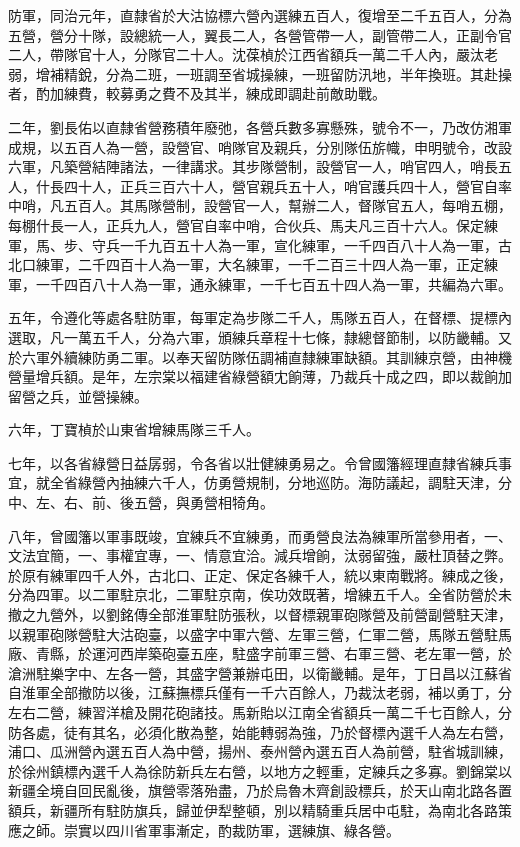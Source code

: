 \begin{pinyinscope}
防軍，同治元年，直隸省於大沽協標六營內選練五百人，復增至二千五百人，分為五營，營分十隊，設總統一人，翼長二人，各營管帶一人，副管帶二人，正副令官二人，帶隊官十人，分隊官二十人。沈葆楨於江西省額兵一萬二千人內，嚴汰老弱，增補精銳，分為二班，一班調至省城操練，一班留防汛地，半年換班。其赴操者，酌加練費，較募勇之費不及其半，練成即調赴前敵助戰。

二年，劉長佑以直隸省營務積年廢弛，各營兵數多寡懸殊，號令不一，乃改仿湘軍成規，以五百人為一營，設營官、哨隊官及親兵，分別隊伍旂幟，申明號令，改設六軍，凡築營結陣諸法，一律講求。其步隊營制，設營官一人，哨官四人，哨長五人，什長四十人，正兵三百六十人，營官親兵五十人，哨官護兵四十人，營官自率中哨，凡五百人。其馬隊營制，設營官一人，幫辦二人，督隊官五人，每哨五棚，每棚什長一人，正兵九人，營官自率中哨，合伙兵、馬夫凡三百十六人。保定練軍，馬、步、守兵一千九百五十人為一軍，宣化練軍，一千四百八十人為一軍，古北口練軍，二千四百十人為一軍，大名練軍，一千二百三十四人為一軍，正定練軍，一千四百八十人為一軍，通永練軍，一千七百五十四人為一軍，共編為六軍。

五年，令遵化等處各駐防軍，每軍定為步隊二千人，馬隊五百人，在督標、提標內選取，凡一萬五千人，分為六軍，頒練兵章程十七條，隸總督節制，以防畿輔。又於六軍外續練防勇二軍。以奉天留防隊伍調補直隸練軍缺額。其訓練京營，由神機營量增兵額。是年，左宗棠以福建省綠營額冘餉薄，乃裁兵十成之四，即以裁餉加留營之兵，並營操練。

六年，丁寶楨於山東省增練馬隊三千人。

七年，以各省綠營日益孱弱，令各省以壯健練勇易之。令曾國籓經理直隸省練兵事宜，就全省綠營內抽練六千人，仿勇營規制，分地巡防。海防議起，調駐天津，分中、左、右、前、後五營，與勇營相犄角。

八年，曾國籓以軍事既竣，宜練兵不宜練勇，而勇營良法為練軍所當參用者，一、文法宜簡，一、事權宜專，一、情意宜洽。減兵增餉，汰弱留強，嚴杜頂替之弊。於原有練軍四千人外，古北口、正定、保定各練千人，統以東南戰將。練成之後，分為四軍。以二軍駐京北，二軍駐京南，俟功效既著，增練五千人。全省防營於未撤之九營外，以劉銘傳全部淮軍駐防張秋，以督標親軍砲隊營及前營副營駐天津，以親軍砲隊營駐大沽砲臺，以盛字中軍六營、左軍三營，仁軍二營，馬隊五營駐馬廠、青縣，於運河西岸築砲臺五座，駐盛字前軍三營、右軍三營、老左軍一營，於滄洲駐樂字中、左各一營，其盛字營兼辦屯田，以衛畿輔。是年，丁日昌以江蘇省自淮軍全部撤防以後，江蘇撫標兵僅有一千六百餘人，乃裁汰老弱，補以勇丁，分左右二營，練習洋槍及開花砲諸技。馬新貽以江南全省額兵一萬二千七百餘人，分防各處，徒有其名，必須化散為整，始能轉弱為強，乃於督標內選千人為左右營，浦口、瓜洲營內選五百人為中營，揚州、泰州營內選五百人為前營，駐省城訓練，於徐州鎮標內選千人為徐防新兵左右營，以地方之輕重，定練兵之多寡。劉錦棠以新疆全境自回民亂後，旗營零落殆盡，乃於烏魯木齊創設標兵，於天山南北路各置額兵，新疆所有駐防旗兵，歸並伊犁整頓，別以精騎重兵居中屯駐，為南北各路策應之師。崇實以四川省軍事漸定，酌裁防軍，選練旗、綠各營。


\end{pinyinscope}
